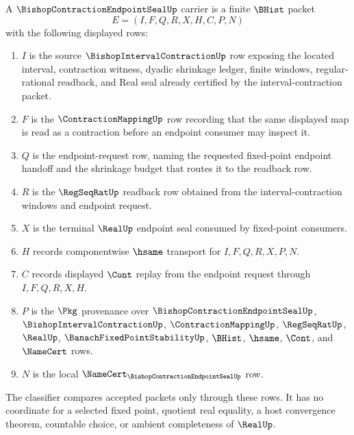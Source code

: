 \begin{definition}
\label{def:bishop-contraction-endpoint-seal-carrier}
A $\BishopContractionEndpointSealUp$ carrier is a finite $\BHist$ packet
$$
E=(I,F,Q,R,X,H,C,P,N)
$$
with the following displayed rows:
\begin{enumerate}
\item $I$ is the source $\BishopIntervalContractionUp$ row exposing the located interval, contraction witness, dyadic shrinkage ledger, finite windows, regular-rational readback, and Real seal already certified by the interval-contraction packet.
\item $F$ is the $\ContractionMappingUp$ row recording that the same displayed map is read as a contraction before an endpoint consumer may inspect it.
\item $Q$ is the endpoint-request row, naming the requested fixed-point endpoint handoff and the shrinkage budget that routes it to the readback row.
\item $R$ is the $\RegSeqRatUp$ readback row obtained from the interval-contraction windows and endpoint request.
\item $X$ is the terminal $\RealUp$ endpoint seal consumed by fixed-point consumers.
\item $H$ records componentwise $\hsame$ transport for $I,F,Q,R,X,P,N$.
\item $C$ records displayed $\Cont$ replay from the endpoint request through $I,F,Q,R,X,H$.
\item $P$ is the $\Pkg$ provenance over $\BishopContractionEndpointSealUp$, $\BishopIntervalContractionUp$, $\ContractionMappingUp$, $\RegSeqRatUp$, $\RealUp$, $\BanachFixedPointStabilityUp$, $\BHist$, $\hsame$, $\Cont$, and $\NameCert$ rows.
\item $N$ is the local $\NameCert_{\BishopContractionEndpointSealUp}$ row.
\end{enumerate}
The classifier compares accepted packets only through these rows. It has no coordinate for a selected fixed point, quotient real equality, a host convergence theorem, countable choice, or ambient completeness of $\RealUp$.
\end{definition}

